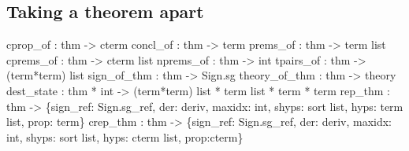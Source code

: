 \subsection{Taking a theorem apart}
\begin{ttbox} 
cprop_of      : thm -> cterm
concl_of      : thm -> term
prems_of      : thm -> term list
cprems_of     : thm -> cterm list
nprems_of     : thm -> int
tpairs_of     : thm -> (term*term) list
sign_of_thm   : thm -> Sign.sg
theory_of_thm : thm -> theory
dest_state : thm * int -> (term*term) list * term list * term * term
rep_thm    : thm -> \{sign_ref: Sign.sg_ref, der: deriv, maxidx: int,
                     shyps: sort list, hyps: term list, prop: term\}
crep_thm   : thm -> \{sign_ref: Sign.sg_ref, der: deriv, maxidx: int,
                     shyps: sort list, hyps: cterm list, prop:{\ts}cterm\}
\end{ttbox}

